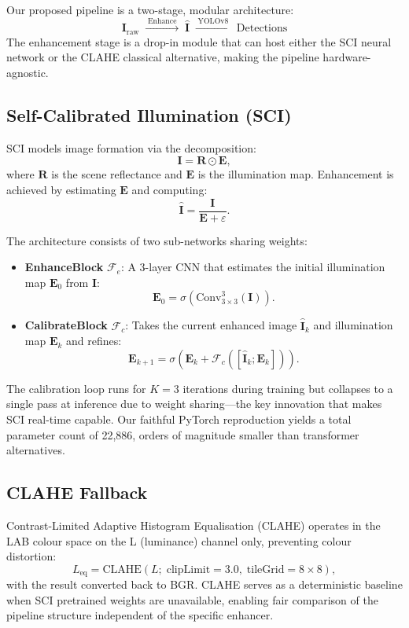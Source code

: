 \documentclass[conference]{IEEEtran}
\begin{document}
Our proposed pipeline is a two-stage, modular architecture:
\[
  \mathbf{I}_{\text{raw}} \;\xrightarrow{\;\text{Enhance}\;}\;
  \hat{\mathbf{I}} \;\xrightarrow{\;\text{YOLOv8}\;}\; \text{Detections}
\]
The enhancement stage is a drop-in module that can host either the
SCI neural network or the CLAHE classical alternative, making the
pipeline hardware-agnostic.

\subsection{Self-Calibrated Illumination (SCI)}

SCI models image formation via the decomposition:
\[
  \mathbf{I} = \mathbf{R} \odot \mathbf{E},
\]
where $\mathbf{R}$ is the scene reflectance and $\mathbf{E}$ is the
illumination map. Enhancement is achieved by estimating $\mathbf{E}$ and
computing:
\[
  \hat{\mathbf{I}} = \frac{\mathbf{I}}{\mathbf{E} + \varepsilon}.
\]

The architecture consists of two sub-networks sharing weights:
\begin{itemize}
  \item \textbf{EnhanceBlock} $\mathcal{F}_e$: A 3-layer CNN that
  estimates the initial illumination map $\mathbf{E}_0$ from $\mathbf{I}$:
  \[
    \mathbf{E}_0 = \sigma\!\left(\text{Conv}_{3\times3}^3(\mathbf{I})\right).
  \]

  \item \textbf{CalibrateBlock} $\mathcal{F}_c$: Takes the current
  enhanced image $\hat{\mathbf{I}}_k$ and illumination map
  $\mathbf{E}_k$ and refines:
  \[
    \mathbf{E}_{k+1} = \sigma\!\left(\mathbf{E}_k +
      \mathcal{F}_c([\hat{\mathbf{I}}_k; \mathbf{E}_k])\right).
  \]
\end{itemize}

The calibration loop runs for $K=3$ iterations during training but
collapses to a single pass at inference due to weight sharing---the key
innovation that makes SCI real-time capable. Our faithful PyTorch
reproduction yields a total parameter count of 22,886, orders of
magnitude smaller than transformer alternatives.

\subsection{CLAHE Fallback}

Contrast-Limited Adaptive Histogram Equalisation (CLAHE) operates in the
LAB colour space on the L (luminance) channel only, preventing colour
distortion:
\[
  L_{\text{eq}} = \text{CLAHE}(L;\; \text{clipLimit}=3.0,\;
  \text{tileGrid}=8\times8),
\]
with the result converted back to BGR. CLAHE serves as a deterministic
baseline when SCI pretrained weights are unavailable, enabling fair
comparison of the pipeline structure independent of the specific
enhancer.
\end{document}
